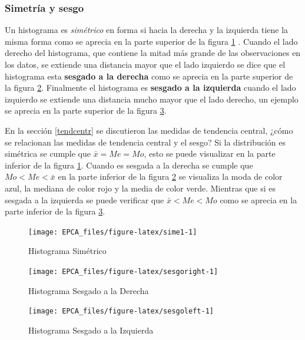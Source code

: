 \documentclass[
]{krantz}
\begin{document}
\hypertarget{simetria-y-sesgo}{%
\subsubsection{Simetría y sesgo}\label{simetria-y-sesgo}}

Un histograma es \emph{simétrico} en forma si hacia la derecha y la izquierda tiene la misma forma como se aprecia en la parte superior de la figura \ref{fig:sime1} \citep{lind2019}. Cuando el lado derecho del histograma, que contiene la mitad más grande de las observaciones en los datos, se extiende una distancia mayor que el lado izquierdo se dice que el histograma esta \textbf{sesgado a la derecha} \citep{envoy2018} como se aprecia en la parte superior de la figura \ref{fig:sesgoright}. Finalmente el histograma es \textbf{sesgado a la izquierda} cuando el lado izquierdo se extiende una distancia mucho mayor que el lado derecho, un ejemplo se aprecia en la parte superior de la figura \ref{fig:sesgoleft}.

En la sección \ref{tendcentr} se discutieron las medidas de tendencia central, ¿cómo se relacionan las medidas de tendencia central y el sesgo? Si la distribución es simétrica se cumple que \(\bar{x}=Me=Mo\), esto se puede visualizar en la parte inferior de la figura \ref{fig:sime1}. Cuando es sesgada a la derecha se cumple que \(Mo < Me < \bar{x}\) en la parte inferior de la figura \ref{fig:sesgoright} se visualiza la moda de color azul, la mediana de color rojo y la media de color verde. Mientras que si es sesgada a la izquierda se puede verificar que \(\bar{x} < Me < Mo\) como se aprecia en la parte inferior de la figura \ref{fig:sesgoleft}.

\begin{figure}[h!]

{\centering \texttt{[image: EPCA\_files/figure-latex/sime1-1]} 

}

\caption{Histograma Simétrico}\label{fig:sime1}
\end{figure}

\begin{figure}[h!]

{\centering \texttt{[image: EPCA\_files/figure-latex/sesgoright-1]} 

}

\caption{Histograma Sesgado a la Derecha}\label{fig:sesgoright}
\end{figure}

\begin{figure}[h!]

{\centering \texttt{[image: EPCA\_files/figure-latex/sesgoleft-1]} 

}

\caption{Histograma Sesgado a la Izquierda}\label{fig:sesgoleft}
\end{figure}
\end{document}
